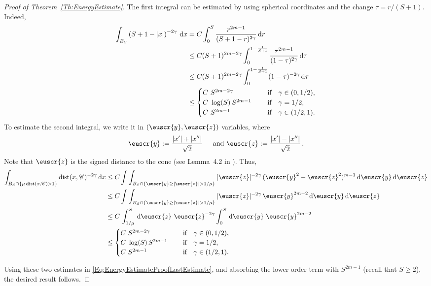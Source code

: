 \begin{proof}[Proof of Theorem~\ref{Th:EnergyEstimate}]
	
	The first integral can be estimated by using spherical coordinates and the change $\tau = r/(S+1)$. Indeed,
	\begin{align*}
	\int_{B_S} \left( S+1-|x| \right)^{-2\gamma} \,\mathrm{d} x & = C \int_0^S \dfrac{r^{2m-1}}{(S+1-r)^{2\gamma}} \,\mathrm{d} r \\
	& \leq C (S+1)^{2m - 2\gamma}\int_0^{1 - \frac{1}{S+1}} \dfrac{\tau^{2m-1}}{(1-\tau)^{2\gamma}} \,\mathrm{d} \tau\\
	&\leq C (S+1)^{2m - 2\gamma}\int_0^{1 - \frac{1}{S+1}} (1-\tau)^{-2\gamma} \,\mathrm{d} \tau \\
	& \leq \begin{cases}
	 C \ S^{2m-2\gamma}\ \ \ \ &\textrm{if } \ \ \gamma\in(0,1/2),\\
	 C\ \log(S)\,S^{2m-1}\ \ \ \ &\textrm{if } \ \ \gamma=1/2,\\
	 C \ S^{2m-1}\ \ \ \ &\textrm{if } \ \ \gamma\in(1/2,1).\\
	 \end{cases}
	\end{align*}
	To estimate the second integral, we write it in $(\euscr{y},\euscr{z})$ variables, where
	$$
	\euscr{y} := \dfrac{|x'|+|x''|}{\sqrt{2}} \, \quad \text{ and } \euscr{z} := \dfrac{|x'|-|x''|}{\sqrt{2}}\,.
	$$
	Note that $\euscr{z}$ is the signed distance to the cone (see Lemma~4.2 in \cite{CabreTerraI}). Thus,
	\begin{align*}
	\int_{B_{S}\cap \{\mu \dist(x,\ccal)>1\}} \dist(x,\ccal)^{-2\s} \d x &\leq C \int \int_{B_{S}\cap \{\euscr{y}\geq|\euscr{z}|>1/\mu\}} |\euscr{z}|^{-2\s} \, (\euscr{y}^2-\euscr{z}^2)^{m-1} \d \euscr{y}\d \euscr{z} \\
	& \leq C \int \int_{B_{S}\cap \{\euscr{y}\geq|\euscr{z}|>1/\mu\}} |\euscr{z}|^{-2\s} \, \euscr{y}^{2m-2} \d \euscr{y}\d \euscr{z} \\
	& \leq C\, \int_{1/\mu}^S \d \euscr{z}   \ \euscr{z}^{-2\s}\int_0^S \d \euscr{y}\  \euscr{y}^{2m-2} \\
	& \leq \begin{cases}
	C \ S^{2m-2\s}\ \ \ \ &\textrm{if } \ \ \s\in(0,1/2),\\
	C\ \log(S)\,S^{2m-1}\ \ \ \ &\textrm{if } \ \ \s=1/2,\\
	C \ S^{2m-1}\ \ \ \ &\textrm{if } \ \ \s\in(1/2,1).\\
	\end{cases}
	\end{align*}
	
	Using these two estimates in \eqref{Eq:EnergyEstimateProofLastEstimate}, and absorbing the lower order term with $S^{2m-1}$ (recall that $S\geq 2$), the desired result follows.
\end{proof}

